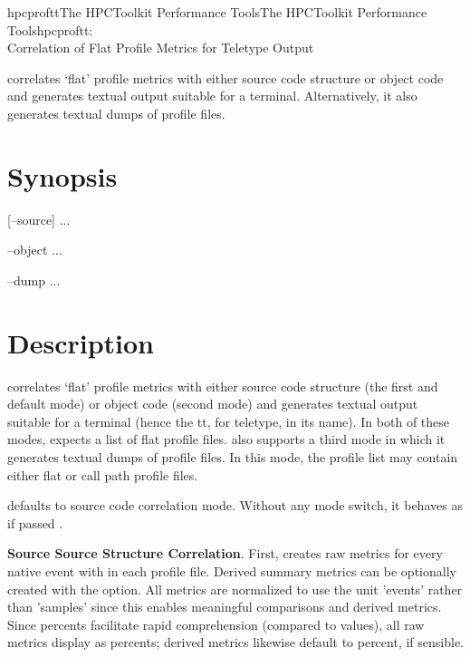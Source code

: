 \documentclass[english]{article}
\begin{document}
\begin{Name}{1}{hpcproftt}{The HPCToolkit Performance Tools}{The HPCToolkit Performance Tools}{hpcproftt:\\ Correlation of Flat Profile Metrics for Teletype Output}

 correlates `flat' profile metrics with either source code structure or object code and generates textual output suitable for a terminal.
Alternatively, it also generates textual dumps of profile files.

\end{Name}

\section{Synopsis}

 [--source]  ...

 --object  ...

 --dump ...


\section{Description}

 correlates `flat' profile metrics with either source code structure (the first and default mode) or object code (second mode) and generates textual output suitable for a terminal (hence the tt, for teletype, in its name).
In both of these modes,  expects a list of flat profile files.
 also supports a third mode in which it generates textual dumps of profile files.
In this mode, the profile list may contain either flat or call path profile files.

 defaults to source code correlation mode.
Without any mode switch, it behaves as if passed .

\textbf{Source Source Structure Correlation}.
First,  creates raw metrics for every native event with in each profile file.
Derived summary metrics can be optionally created with the  option.
All metrics are normalized to use the unit 'events' rather than 'samples' since this enables meaningful comparisons and derived metrics.
Since percents facilitate rapid comprehension (compared to values), all raw metrics display as percents; derived metrics likewise default to percent, if sensible.
\end{document}
